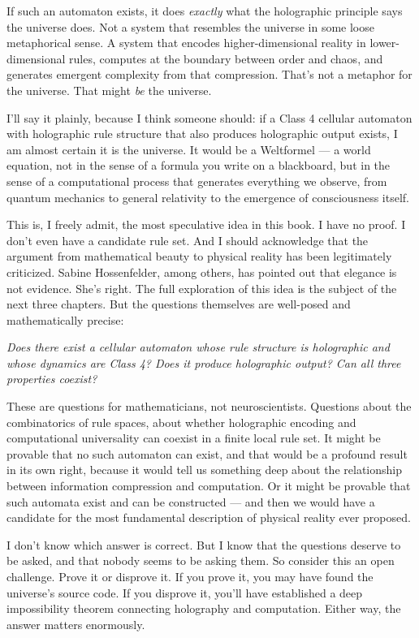 \documentclass[11pt, twoside, openright]{book}
\begin{document}
If such an automaton exists, it does \textit{exactly} what the holographic principle says the universe does. Not a system that resembles the universe in some loose metaphorical sense. A system that encodes higher-dimensional reality in lower-dimensional rules, computes at the boundary between order and chaos, and generates emergent complexity from that compression. That's not a metaphor for the universe. That might \textit{be} the universe.

I'll say it plainly, because I think someone should: if a Class 4 cellular automaton with holographic rule structure that also produces holographic output exists, I am almost certain it is the universe. It would be a Weltformel --- a world equation, not in the sense of a formula you write on a blackboard, but in the sense of a computational process that generates everything we observe, from quantum mechanics to general relativity to the emergence of consciousness itself.

This is, I freely admit, the most speculative idea in this book. I have no proof. I don't even have a candidate rule set. And I should acknowledge that the argument from mathematical beauty to physical reality has been legitimately criticized. Sabine Hossenfelder, among others, has pointed out that elegance is not evidence. She's right. The full exploration of this idea is the subject of the next three chapters. But the questions themselves are well-posed and mathematically precise:

\textit{Does there exist a cellular automaton whose rule structure is holographic and whose dynamics are Class 4? Does it produce holographic output? Can all three properties coexist?}

These are questions for mathematicians, not neuroscientists. Questions about the combinatorics of rule spaces, about whether holographic encoding and computational universality can coexist in a finite local rule set. It might be provable that no such automaton can exist, and that would be a profound result in its own right, because it would tell us something deep about the relationship between information compression and computation. Or it might be provable that such automata exist and can be constructed --- and then we would have a candidate for the most fundamental description of physical reality ever proposed.

I don't know which answer is correct. But I know that the questions deserve to be asked, and that nobody seems to be asking them. So consider this an open challenge. Prove it or disprove it. If you prove it, you may have found the universe's source code. If you disprove it, you'll have established a deep impossibility theorem connecting holography and computation. Either way, the answer matters enormously.
\end{document}
